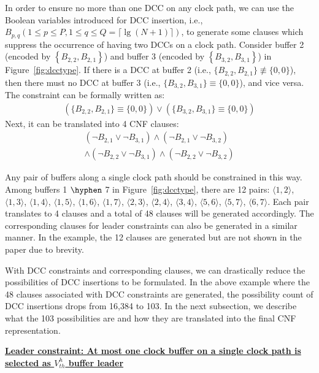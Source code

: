 In order to ensure no more than one DCC on any clock path, we can use the Boolean variables introduced for DCC insertion, i.e., $B_{p,q} \left(1 \leq p \leq P, 1 \leq q \leq Q = \lceil \lg (N + 1) \rceil \right)$, to generate some clauses which suppress the occurrence of having two DCCs on a clock path. Consider buffer 2 (encoded by $\left\{B_{2,2}, B_{2,1}\right\}$) and buffer 3 (encoded by $\left\{B_{3,2}, B_{3,1}\right\}$) in Figure~\ref{fig:dcctype}. If there is a DCC at buffer 2 (i.e., $\{B_{2,2}, B_{2,1}\} \not\equiv \{0, 0\}$), then there must no DCC at buffer 3 (i.e., $\{B_{3,2}, B_{3,1}\} \equiv \{0, 0\}$), and vice versa. The constraint can be formally written as:
\begin{gather*}
\left(\{B_{2,2}, B_{2,1}\} \equiv \{0, 0\}\right) \lor \left(\{B_{3,2}, B_{3,1}\} \equiv \{0, 0\}\right)
\end{gather*}
Next, it can be translated into 4 CNF clauses:
\begin{equation*}
\begin{split}
(\neg B_{2,1}\lor\neg B_{3,1}) \land (\neg B_{2,1}\lor\neg B_{3,2}) \\
\land (\neg B_{2,2}\lor\neg B_{3,1}) \land (\neg B_{2,2}\lor\neg B_{3,2})
\end{split}
\end{equation*}

Any pair of buffers along a single clock path should be constrained in this way. Among buffers 1 $\hyphen$ 7 in Figure~\ref{fig:dcctype}, there are 12 pairs: $\langle1, 2\rangle$, $\langle1, 3\rangle$, $\langle1, 4\rangle$, $\langle1, 5\rangle$, $\langle1, 6\rangle$, $\langle1, 7\rangle$, $\langle2, 3\rangle$, $\langle2, 4\rangle$, $\langle3, 4\rangle$, $\langle5, 6\rangle$, $\langle5, 7\rangle$, $\langle6, 7\rangle$. Each pair translates to 4 clauses and a total of 48 clauses will be generated accordingly.
The corresponding clauses for leader constraints can also be generated in a similar manner. In the example, the 12 clauses are generated but are not shown in the paper due to brevity.

With DCC constraints and corresponding clauses, we can drastically reduce the possibilities of DCC insertions to be formulated. In the above example where the 48 clauses associated with DCC constraints are generated, the possibility count of DCC insertions drops from 16,384 to 103. In the next subsection, we describe what the 103 possibilities are and how they are translated into the final CNF representation.

{\noindent \textbf{\uline{Leader constraint: At most one clock buffer on a single clock path is selected as $V_{th}^h$ buffer leader}}}

